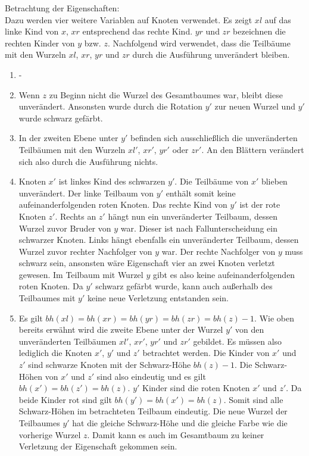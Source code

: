 \documentclass[a4paper,12pt]{article}
\begin{document}
\noindent Betrachtung der Eigenschaften:\\
\noindent Dazu werden vier weitere Variablen auf Knoten verwendet. Es zeigt $\mathit{xl}$ auf das linke Kind von $x$,  $\mathit{xr}$ entsprechend das rechte Kind. $\mathit{yr}$ und $zr$ bezeichnen die rechten Kinder von $y$ bzw. $z$. Nachfolgend wird verwendet, dass die Teilbäume mit den Wurzeln $xl$, $xr$, $yr$ und $zr$ durch die Ausführung unverändert bleiben.
\begin{enumerate}
	\item -
	\item Wenn $z$ zu Beginn nicht die Wurzel des Gesamtbaumes war, bleibt diese unverändert. Ansonsten wurde durch die Rotation $y'$ zur neuen Wurzel und $y'$ wurde schwarz gefärbt. 
	\item  In der zweiten Ebene unter $y'$ befinden sich ausschließlich die unveränderten Teilbäumen mit den Wurzeln $xl'$, $xr'$, $yr'$ oder $zr'$. An den Blättern verändert sich also durch die Ausführung nichts.
	\item  Knoten $x'$ ist linkes Kind des schwarzen $y'$. Die Teilbäume von $x'$ blieben unverändert. Der linke Teilbaum von $y'$ enthält somit keine aufeinanderfolgenden roten Knoten. Das rechte Kind von $y'$ ist der rote Knoten $z'$. Rechts an $z'$ hängt nun ein unveränderter Teilbaum, dessen Wurzel zuvor Bruder von $y$ war. Dieser ist nach Fallunterscheidung ein schwarzer Knoten. Links hängt ebenfalls ein unveränderter Teilbaum, dessen Wurzel zuvor rechter Nachfolger von $y$ war. Der rechte Nachfolger von $y$ muss schwarz sein, ansonsten wäre Eigenschaft vier an zwei Knoten verletzt gewesen. Im Teilbaum mit Wurzel $y$ gibt es also keine aufeinanderfolgenden roten Knoten. Da $y'$ schwarz gefärbt wurde, kann auch außerhalb des Teilbaumes mit $y'$ keine neue Verletzung entstanden sein.
	\item  Es gilt  $\mathit{bh(xl)} = \mathit{bh(xr)} = \mathit{bh(yr)} =  \mathit{bh(zr)} = \mathit{bh(z)} - 1$. Wie oben bereits erwähnt wird die zweite Ebene unter der Wurzel $y'$ von den unveränderten Teilbäumen $\mathit{xl'}$, $\mathit{xr'}$, $\mathit{yr'}$ und $\mathit{zr'}$ gebildet. Es müssen also lediglich die Knoten $x'$, $y'$ und $z'$ betrachtet werden. Die Kinder von $x'$ und $z'$ sind schwarze Knoten mit der Schwarz-Höhe $\mathit{bh(z)} - 1$. Die Schwarz-Höhen von $x'$ und $z'$ sind also eindeutig und es gilt $\mathit{bh(x')} = \mathit{bh(z')} = \mathit{bh(z)}$. $y'$ Kinder sind die roten Knoten $x'$ und $z'$. Da beide Kinder rot sind gilt $\mathit{bh(y')} = \mathit{bh(x')} = \mathit{bh(z)}$. Somit sind alle Schwarz-Höhen im betrachteten Teilbaum eindeutig. Die neue Wurzel der Teilbaumes $y'$ hat die gleiche Schwarz-Höhe und die gleiche Farbe wie die vorherige Wurzel $z$. Damit kann es auch im Gesamtbaum zu keiner Verletzung der Eigenschaft gekommen sein.
\end{enumerate} 
\end{document}
